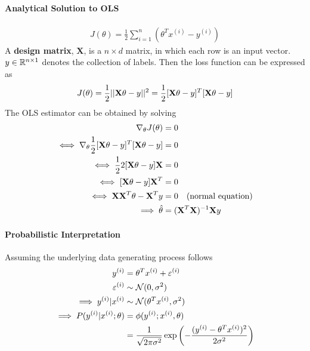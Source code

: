 \documentclass{report}
\begin{document}
        \paragraph{Analytical Solution to OLS}
        \begin{align}
            J(\theta) = \frac{1}{2} \sum_{i=1}^n \left(\theta^T x^{(i)} - y^{(i)}\right)
        \end{align}
        A \textbf{design matrix}, $\textbf{X}$, is a $n \times d$ matrix, in which each row is an input vector. $y \in \mathbb{R}^{n \times 1}$ denotes the collection of labels. Then the loss function can be expressed as
        \begin{align}
            J(\theta) = \frac{1}{2} \vert \vert {\textbf{X}\theta - y} \vert \vert^2 = \frac{1}{2} [\textbf{X}\theta - y]^T [\textbf{X}\theta - y]
        \end{align}
        The OLS estimator can be obtained by solving
        \begin{align}
            \nabla_\theta J(\theta) &= 0 \\
            \iff \nabla_\theta \frac{1}{2} [\textbf{X}\theta - y]^T [\textbf{X}\theta - y] &= 0 \\
            \iff \frac{1}{2} 2 [\textbf{X}\theta - y] \textbf{X} &= 0 \\
            \iff [\textbf{X}\theta - y] \textbf{X}^T &= 0  \\
            \iff \textbf{X} \textbf{X}^T \theta - \textbf{X}^T y &= 0 \quad (\text{{normal equation}}) \\
            \implies \hat{\theta} &= (\textbf{X}^T \textbf{X})^{-1} \textbf{X} y
        \end{align}
        \paragraph{Probabilistic Interpretation} Assuming the underlying data generating process follows
        \begin{align}
            y^{(i)} &= \theta^T x^{(i)} + \varepsilon^{(i)} \\
            \varepsilon^{(i)} &\sim \mathcal{{N}}(0, \sigma^2) \\
            \implies y^{(i)}|x^{(i)} &\sim \mathcal{{N}}(\theta^T x^{(i)}, \sigma^2) \\
            \implies P(y^{(i)}|x^{(i)}; \theta) &= \phi(y^{(i)}; x^{(i)}, \theta) \\
            &= \frac{1}{\sqrt{2\pi \sigma^2}} \exp\left(
                -\frac{(y^{(i)} - \theta^T x^{(i)})^2}{2 \sigma^2}
            \right)
        \end{align}
\end{document}
